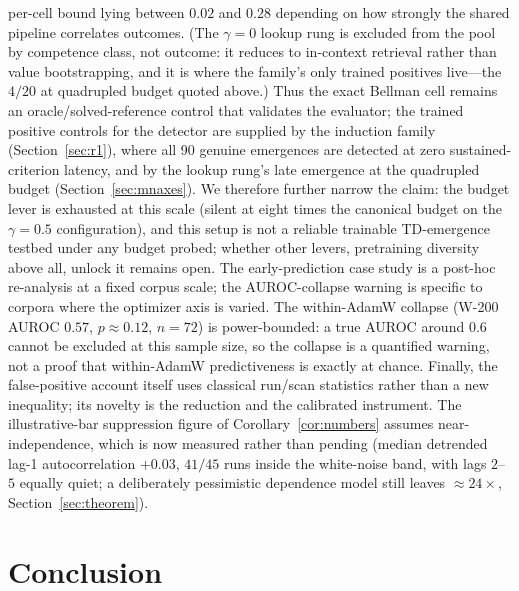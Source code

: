 \documentclass[11pt]{article}
\theoremstyle{plain}
\theoremstyle{definition}
\begin{document}
per-cell bound lying between $0.02$ and $0.28$ depending on how strongly the shared
pipeline correlates outcomes. (The $\gamma=0$ lookup rung is excluded from
the pool by competence class, not outcome: it reduces to in-context retrieval rather
than value bootstrapping, and it is where the family's only trained positives
live---the $4/20$ at quadrupled budget quoted above.) Thus the exact Bellman cell remains an oracle/solved-reference control that
validates the evaluator; the trained positive controls for the detector are supplied by
the induction family (Section~\ref{sec:r1}), where all 90 genuine emergences are
detected at zero sustained-criterion latency, and by the lookup rung's late emergence
at the quadrupled budget (Section~\ref{sec:mnaxes}). We therefore further narrow the
claim: the budget lever is exhausted at this scale (silent at eight times the
canonical budget on the $\gamma=0.5$ configuration), and this setup is not a reliable
trainable TD-emergence testbed under any budget probed; whether other levers,
pretraining diversity above all, unlock it remains open.
The early-prediction case study is a post-hoc re-analysis at a fixed corpus scale; the AUROC-collapse warning is
specific to corpora where the optimizer axis is varied.
The within-AdamW collapse (W-200 AUROC $0.57$, $p\approx0.12$, $n=72$) is power-bounded:
a true AUROC around $0.6$ cannot be excluded at this sample size, so the collapse is a
quantified warning, not a proof that within-AdamW predictiveness is exactly at chance.
Finally, the false-positive account itself uses classical run/scan statistics rather than a
new inequality; its novelty is the reduction and the calibrated instrument. The
illustrative-bar suppression figure of Corollary~\ref{cor:numbers} assumes near-independence, which is now measured rather than pending
(median detrended lag-1 autocorrelation $+0.03$, $41/45$ runs inside the white-noise
band, with lags $2$--$5$ equally quiet; a deliberately pessimistic dependence model still
leaves ${\approx}24\times$, Section~\ref{sec:theorem}).

\section{Conclusion}\label{sec:conclusion}
\end{document}

